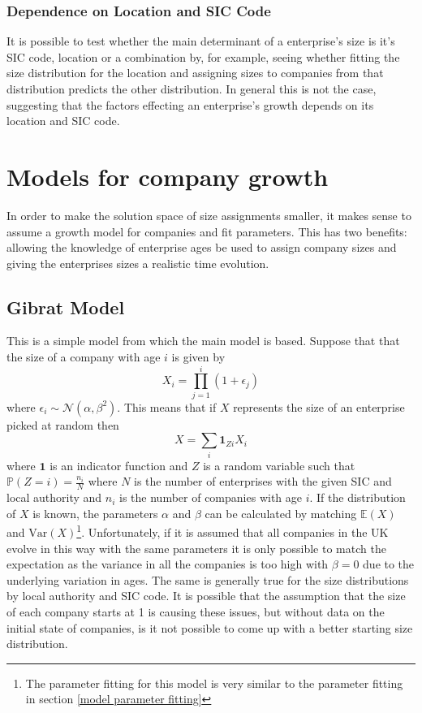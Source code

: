 \documentclass[a4paper,10pt]{article}
\begin{document}
\subsubsection{Dependence on Location and SIC Code}
It is possible to test whether the main determinant of a enterprise's size is it's SIC code, location or a combination by, for example, seeing whether fitting the size distribution for the location and assigning sizes to companies from that distribution predicts the other distribution. In general this is not the case, suggesting that the factors effecting an enterprise's growth depends on its location and SIC code.


\section{Models for company growth}

In order to make the solution space of size assignments smaller, it makes sense to assume a growth model for companies and fit parameters. This has two benefits: allowing the knowledge of enterprise ages be used to assign company sizes and giving the enterprises sizes a realistic time evolution.  
\subsection{Gibrat Model}
This is a simple model from which the main model is based. Suppose that that the size of a company with age $i$ is given by
\begin{equation}
 X_i = \prod_{j=1}^{i}(1 + \epsilon_j)
 \label{company_size}
\end{equation}
where $\epsilon_i \sim \mathcal{N}(\alpha, \beta^2)$. This means that if $X$ represents the size of an enterprise picked at random then
\begin{equation}
 X = \sum_{i}\mathbf{1}_{Zi}X_i
 \label{overall_dist}
\end{equation}
where $\mathbf{1}$ is an indicator function and $Z$ is a random variable such that $\mathbb{P}(Z = i) = \frac{n_i}{N}$ where $N$ is the number of enterprises with the given SIC and local authority and $n_i$ is the number of companies with age $i$. If the distribution of $X$ is known, the parameters $\alpha$ and $\beta$ can be calculated by matching $\mathbb{E}(X)$ and $\mathrm{Var}(X)$\footnote{The parameter fitting for this model is very similar to the parameter fitting in section \ref{model parameter fitting}}. Unfortunately, if it is assumed that all companies in the UK evolve in this way with the same parameters it is only possible to match the expectation as the variance in all the companies is too high with $\beta = 0$ due to the underlying variation in ages. The same is generally true for the size distributions by local authority and SIC code. It is possible that the assumption that the size of each company starts at 1 is causing these issues, but without data on the initial state of companies, is it not possible to come up with a better starting size distribution.
\end{document}
